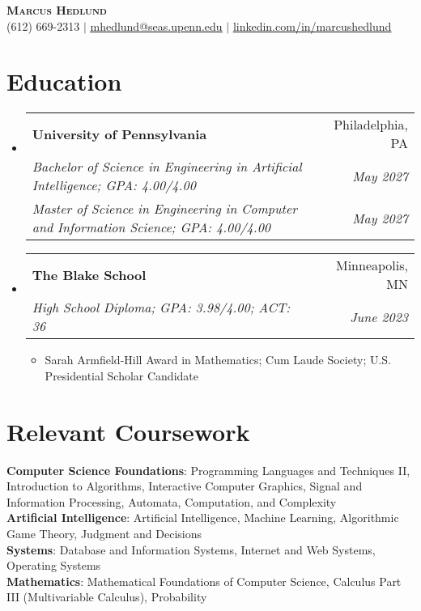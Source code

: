 \documentclass[letterpaper,11pt]{article}
\makeatletter
\newcommand{\resumeItem}[1]{
  \item\small{
    {#1 \vspace{-2pt}}
  }
}
\newcommand{\resumeSubheading}[4]{
  \vspace{-2pt}\item
    \begin{tabular*}{0.97\textwidth}[t]{l@{\extracolsep{\fill}}r}
      \textbf{#1} & #2 \\
      \textit{\small#3} & \textit{\small #4} \\
    \end{tabular*}\vspace{-7pt}
}
\newcommand{\resumeSubheadingMasters}[6]{
  \vspace{-2pt}\item
    \begin{tabular*}{0.97\textwidth}[t]{l@{\extracolsep{\fill}}r}
      \textbf{#1} & #2 \\
      \textit{\small#3} & \textit{\small #4} \\
      \textit{\small#5} & \textit{\small #6} \\
    \end{tabular*}\vspace{-7pt}
}
\newcommand{\resumeSubHeadingListStart}{\begin{itemize}[leftmargin=0.15in, label={}]}
\newcommand{\resumeSubHeadingListEnd}{\end{itemize}}
\newcommand{\resumeItemListStart}{\begin{itemize}}
\newcommand{\resumeItemListEnd}{\end{itemize}\vspace{-5pt}}
\makeatother
\begin{document}
\begin{center}
    \textbf{\Huge \scshape Marcus Hedlund} \\ \vspace{1pt}
    \small
(612) 669-2313 $|$ \href{mailto:mhedlund@seas.upenn.edu}{\underline{mhedlund@seas.upenn.edu}} $|$ 
    \href{http://linkedin.com/in/marcushedlund}{\underline{linkedin.com/in/marcushedlund}}
\end{center}

\section{Education}
  \resumeSubHeadingListStart
    \resumeSubheadingMasters
      {University of Pennsylvania}{Philadelphia, PA}
      {Bachelor of Science in Engineering in Artificial Intelligence; GPA: 4.00/4.00}{May 2027}{Master of Science in Engineering in Computer and Information Science; GPA: 4.00/4.00}{May 2027}
    \resumeSubheading
      {The Blake School}{Minneapolis, MN}
      {High School Diploma; GPA: 3.98/4.00; ACT: 36}{June 2023}
      \resumeItemListStart
        \resumeItem{Sarah Armfield-Hill Award in Mathematics; Cum Laude Society; U.S. Presidential Scholar Candidate}
      \resumeItemListEnd

  \resumeSubHeadingListEnd

\section{Relevant Coursework}

 \begin{itemize}[leftmargin=0.15in, label={}]
    \small{\item{
     \textbf{Computer Science Foundations}{: Programming Languages and Techniques II, Introduction to Algorithms, Interactive Computer Graphics, Signal and Information Processing, Automata, Computation, and Complexity} \\
     \textbf{Artificial Intelligence}{: Artificial Intelligence, Machine Learning, Algorithmic Game Theory, Judgment and Decisions} \\
     \textbf{Systems}{: Database and Information Systems, Internet and Web Systems,  Operating Systems} \\
     \textbf{Mathematics}{: Mathematical Foundations of Computer Science, Calculus Part III (Multivariable Calculus), Probability} \\
    }}
 \end{itemize}
 
\end{document}
